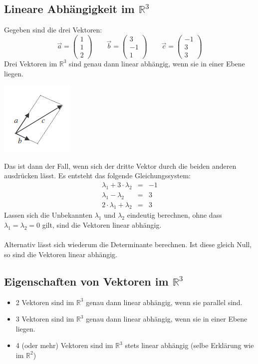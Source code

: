 \subsection{Lineare Abhängigkeit im $\mathbb{R}^3$}
Gegeben sind die drei Vektoren:
\begin{equation*}
\vec{a} = \begin{pmatrix}1\\1\\2\end{pmatrix}\quad\quad \vec{b} = \begin{pmatrix}3\\-1\\1\end{pmatrix}\quad\quad \vec{c} = \begin{pmatrix}-1\\3\\3\end{pmatrix}
\end{equation*}
Drei Vektoren im $\mathbb{R}^3$ sind genau dann linear abhängig, wenn sie in einer Ebene liegen. 
\begin{center}\includegraphics[scale=0.9]{imgs/pic1.png}\end{center}
Das ist dann der Fall, wenn sich der dritte Vektor durch die beiden anderen ausdrücken lässt. Es entsteht das folgende Gleichungssystem:
\begin{eqnarray*}
\lambda_1 + 3\cdot \lambda_2 &=& -1\\
\lambda_1 - \lambda_2 &=& 3\\
2\cdot \lambda_1 + \lambda_2 &=& 3
\end{eqnarray*}
Lassen sich die Unbekannten $\lambda_1$ und $\lambda_2$ eindeutig berechnen, ohne dass $\lambda_1 = \lambda_2 = 0$ gilt, sind die Vektoren linear abhängig.\\\\
Alternativ lässt sich wiederum die Determinante berechnen. Ist diese gleich Null, so sind die Vektoren linear abhängig.
\subsection{Eigenschaften von Vektoren im $\mathbb{R}^3$}
\begin{itemize}
	\item 2 Vektoren sind im $\mathbb{R}^3$ genau dann linear abhängig, wenn sie parallel sind.
	\item 3 Vektoren sind im $\mathbb{R}^3$ genau dann linear abhängig, wenn sie in einer Ebene liegen.
	\item 4 (oder mehr) Vektoren sind im $\mathbb{R}^3$ stets linear abhängig (selbe Erklärung wie im $\mathbb{R}^2$)
\end{itemize}

